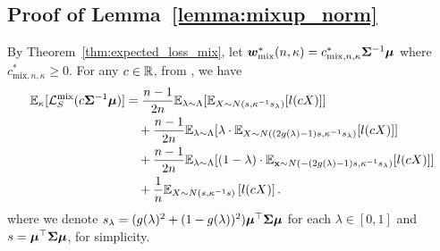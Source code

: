 \subsection{Proof of Lemma~\ref{lemma:mixup_norm}}\label{proof:lemma:mixup_norm}
By Theorem~\ref{thm:expected_loss_mix}, let ${\bm{w}}^*_\mathrm{mix}(n,\kappa) = c_{\mathrm{mix}, n, \kappa}^* {\bm{\Sigma}}^{-1} {\bm{\mu}}$ where $c_{\mathrm{mix}, n, \kappa }^* \geq 0 $. For any $c \in \mathbb{R}$, from , we have
\begin{align*}
    \mathbb{E}_\kappa[\mathcal{L}_S^\mathrm{mix}(c {\bm{\Sigma}}^{-1} {\bm{\mu}})]
    &= \frac{n-1}{2n} \mathbb{E}_{\lambda \sim \Lambda}[\mathbb{E}_{X \sim N(s, \kappa^{-1} s_\lambda) } [l(c X)]] \\
    &\quad+ \frac{n-1}{2n} \mathbb{E}_{\lambda \sim \Lambda}[\lambda \cdot\mathbb{E}_{X \sim N((2g(\lambda)-1)s, \kappa^{-1} s_\lambda) }[ l(cX)]] \\
    &\quad+ \frac{n-1}{2n} \mathbb{E}_{\lambda \sim \Lambda}[(1-\lambda) \cdot\mathbb{E}_{{\mathbf{x}} \sim N(-(2g(\lambda)-1)s, \kappa^{-1} s_\lambda) }[ l(cX)]] \\
    &\quad+ \frac{1}{n} \mathbb{E}_{X \sim N(s,\kappa^{-1}s) }\left[ l(c X)\right].
\end{align*}
where we denote $s_\lambda = (g(\lambda)^2 + (1-g(\lambda))^2) {\bm{\mu}}^\top {\bm{\Sigma}} {\bm{\mu}}$ for each $\lambda \in [0,1]$ and $s = {\bm{\mu}}^\top {\bm{\Sigma}} {\bm{\mu}}$, for simplicity.


